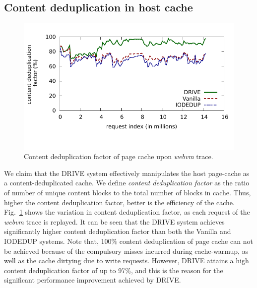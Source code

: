 \subsection{Content deduplication in host cache}
\begin{figure}[]
\centering
\includegraphics[scale=1]{confided-figures/contentdedup-factor/contentdedupfactor.pdf}
\vspace{-0.4in}
\caption{Content deduplication factor of page cache upon \textit{webvm} trace.}
\label{fig:contentdedup-factor-timeseries}
\end{figure}

We claim that the DRIVE system 
effectively manipulates the host page-cache as a content-deduplicated
cache. We define 
\textit{content deduplication factor} as the ratio of number of unique
content blocks to the total number of blocks in cache. Thus, higher the
content deduplication factor, better is the efficiency of the cache.
Fig.~\ref{fig:contentdedup-factor-timeseries} shows the variation in
content deduplication factor, as each request of the \textit{webvm}
trace is replayed. It can be seen that the DRIVE system achieves
significantly higher content deduplication factor than both the 
Vanilla and IODEDUP systems. Note that, 100\% content deduplication 
of page cache can not be achieved because of the compulsory misses
incurred during cache-warmup, as well as the cache dirtying due to 
write requests. However, DRIVE attains a high 
content deduplication factor of up to 97\%, and this is the reason for 
the significant performance improvement achieved by DRIVE.

